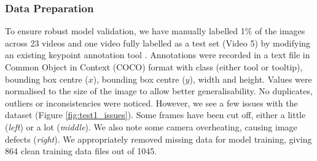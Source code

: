 

\subsubsection{Data Preparation}

To ensure robust model validation, we have manually labelled 1\% of the images across 23 videos and one video fully labelled as a test set (Video 5) by modifying an existing keypoint annotation tool \cite{herrera_luiscarlosgphkeypoint-annotation-tool_2024}. Annotations were recorded in a text file in Common Object in Context (COCO) format with class (either tool or tooltip), bounding box centre ($x$), bounding box centre ($y$), width and height. Values were normalised to the size of the image to allow better generalisability. No duplicates, outliers or inconsistencies were noticed. However, we see a few issues with the dataset (Figure \ref{fig:test1_issues}). Some frames have been cut off, either a little (\textit{left}) or a lot (\textit{middle}). We also note some camera overheating, causing image defects (\textit{right}). We appropriately removed missing data for model training, giving 864 clean training data files out of 1045.

